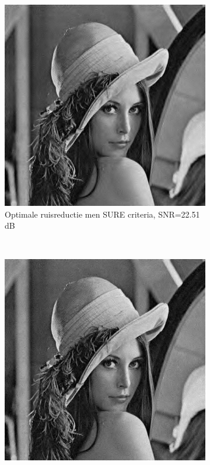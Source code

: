 \begin{figure}
    \centering
    \begin{subfigure}[b]{0.4\textwidth}
        \includegraphics[width=\textwidth]{../src/denoising/sure/SURE_SNR}
        \caption{Optimale ruisreductie men SURE criteria, SNR=22.51 dB }
    \end{subfigure}
    ~ %
    \begin{subfigure}[b]{0.4\textwidth}
        \includegraphics[width=\textwidth]{../src/denoising/sure/SURE_SURE}

\end{subfigure}
\end{figure}
